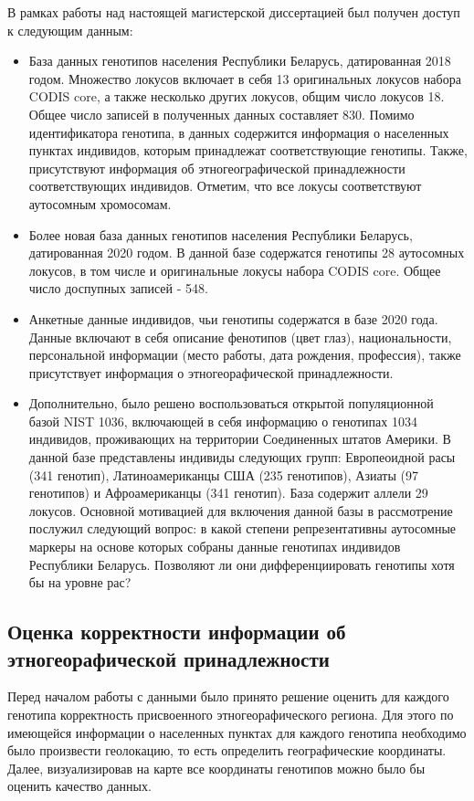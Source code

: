 В рамках работы над настоящей магистерской диссертацией был получен доступ к следующим данным:
\begin{itemize}
\item База данных генотипов населения Республики Беларусь, датированная 2018 годом.
Множество локусов включает в себя 13 оригинальных локусов набора CODIS core, а также несколько
других локусов, общим число локусов 18. Общее число записей в полученных данных составляет 830.
Помимо идентификатора генотипа, в данных содержится информация о населенных пунктах индивидов, которым
принадлежат соответствующие генотипы. Также, присутствуют информация об этногеографической
принадлежности соответствующих индивидов. Отметим, что все локусы соответствуют аутосомным хромосомам.

\item Более новая база данных генотипов населения Республики Беларусь, датированная 2020 годом.
В данной базе содержатся генотипы 28 аутосомных локусов, в том числе и оригинальные локусы
набора CODIS core. Общее число доспупных записей - 548.

\item Анкетные данные индивидов, чьи генотипы содержатся в базе 2020 года. Данные включают
в себя описание фенотипов (цвет глаз), национальности, персональной информации
(место работы, дата рождения, профессия), также присутствует информация о этногеорафической принадлежности.

\item Дополнительно, было решено воспользоваться открытой популяционной базой NIST 1036,
включающей в себя информацию о генотипах 1034 индивидов, проживающих на территории
Соединенных штатов Америки. В данной базе представлены индивиды следующих групп:
Европеоидной расы (341 генотип), Латиноамериканцы США (235 генотипов), Азиаты (97 генотипов)
и Афроамериканцы (341 генотип). База содержит аллели 29 локусов. Основной мотивацией для включения
данной базы в рассмотрение послужил следующий вопрос: в какой степени репрезентативны аутосомные
маркеры на основе которых собраны данные генотипах индивидов Республики Беларусь. Позволяют ли они
дифференциировать генотипы хотя бы на уровне рас?
\end{itemize}

\subsection{Оценка корректности информации об этногеорафической принадлежности}

Перед началом работы с данными было принято решение оценить для каждого генотипа
корректность присвоенного этногеорафического региона. Для этого по имеющейся информации
о населенных пунктах для каждого генотипа необходимо было произвести геолокацию, то есть
определить географические координаты. Далее, визуализировав на карте все координаты генотипов
можно было бы оценить качество данных.

